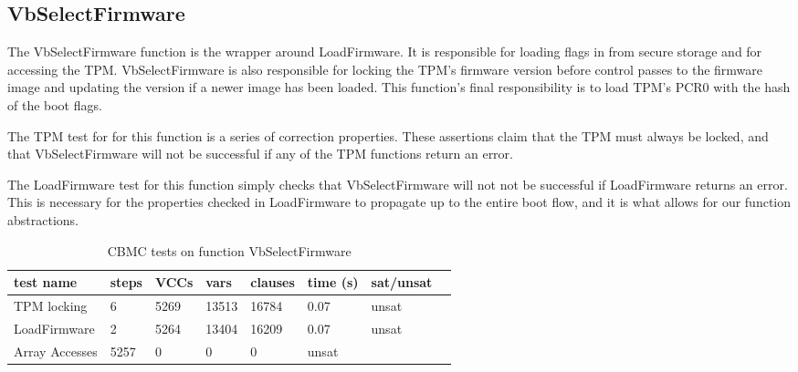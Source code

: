 \documentclass[../report.tex]{subfiles}
\begin{document}
\subsection{VbSelectFirmware}

The VbSelectFirmware function is the wrapper around LoadFirmware.
It is responsible for loading flags in from secure storage and for accessing the TPM\@.
VbSelectFirmware is also responsible for locking the TPM's firmware version before control passes to the firmware image and updating the version if a newer image has been loaded.
This function's final responsibility is to load TPM's PCR0 with the hash of the boot flags.

The TPM test for for this function is a series of correction properties. 
These assertions claim that the TPM must always be locked, and that VbSelectFirmware will not be successful if any of the TPM functions return an error.

The LoadFirmware test for this function simply checks that VbSelectFirmware will not not be successful if LoadFirmware returns an error.
This is necessary for the properties checked in LoadFirmware to propagate up to the entire boot flow, and it is what allows for our function abstractions.

\begin{table}[]
    \centering
    \caption{CBMC tests on function VbSelectFirmware}\label{sfw_results}
    \begin{tabular}{|l|l|l|l|l|l|l|l|}
        \hline
        test name & steps & VCCs & vars  & clauses & time (s) & sat/unsat  \\ \hline \hline
        TPM locking & 6 & 5269 & 13513 & 16784 & 0.07 & unsat \\ \hline
        LoadFirmware & 2 & 5264 & 13404 & 16209 & 0.07 & unsat \\ \hline
        Array Accesses & 5257 & 0 & 0 & 0 & unsat \\ \hline
    \end{tabular}
\end{table}

\clearpage
\end{document}
